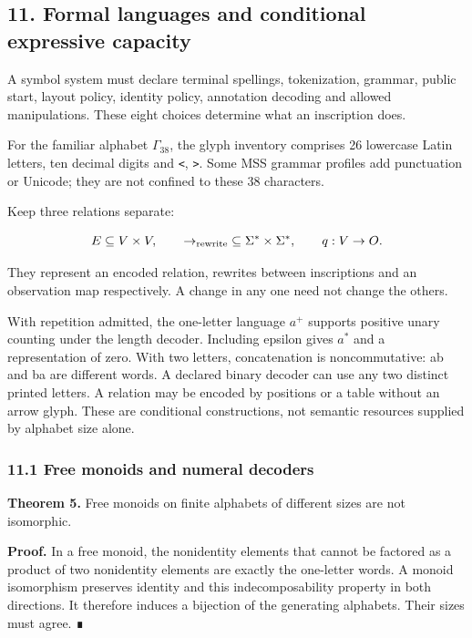 \documentclass[
  11pt,
]{article}
\begin{document}
\subsection{11. Formal languages and conditional expressive
capacity}\label{formal-languages-and-conditional-expressive-capacity}

A symbol system must declare terminal spellings, tokenization, grammar,
public start, layout policy, identity policy, annotation decoding and
allowed manipulations. These eight choices determine what an inscription
does.

For the familiar alphabet \(\Gamma_{38}\), the glyph inventory comprises
26 lowercase Latin letters, ten decimal digits and \texttt{\textless{}},
\texttt{\textgreater{}}. Some MSS grammar profiles add punctuation or
Unicode; they are not confined to these 38 characters.

Keep three relations separate:

\[
E\subseteq V\times V,\qquad
\to_{\rm rewrite}\;\subseteq\Sigma^*\times\Sigma^*,\qquad
q:V\to O.
\]

They represent an encoded relation, rewrites between inscriptions and an
observation map respectively. A change in any one need not change the
others.

With repetition admitted, the one-letter language \(a^+\) supports
positive unary counting under the length decoder. Including epsilon
gives \(a^*\) and a representation of zero. With two letters,
concatenation is noncommutative: ab and ba are different words. A
declared binary decoder can use any two distinct printed letters. A
relation may be encoded by positions or a table without an arrow glyph.
These are conditional constructions, not semantic resources supplied by
alphabet size alone.

\subsubsection{11.1 Free monoids and numeral
decoders}\label{free-monoids-and-numeral-decoders}

\textbf{Theorem 5.} Free monoids on finite alphabets of different sizes
are not isomorphic.

\textbf{Proof.} In a free monoid, the nonidentity elements that cannot
be factored as a product of two nonidentity elements are exactly the
one-letter words. A monoid isomorphism preserves identity and this
indecomposability property in both directions. It therefore induces a
bijection of the generating alphabets. Their sizes must agree. ∎
\end{document}
